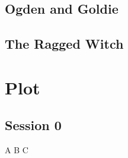 \documentclass{report}
\begin{document}
  \section{Ogden and Goldie}\label{sec:ogdenAndGoldie}
  \subsej

  \section{The Ragged Witch}\label{sec:theRaggedWitch}

  \chapter{Plot}\label{ch:plot}

  \section{Session 0}\label{sec:session0}

  A B C
\end{document}
